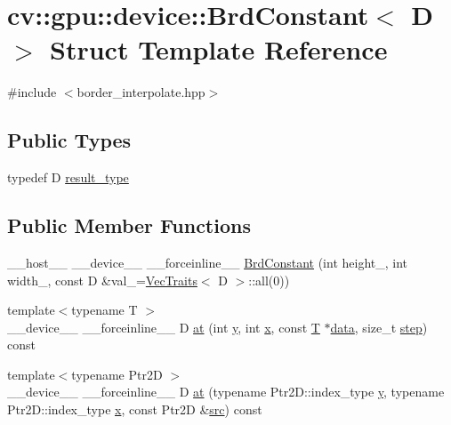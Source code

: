 \hypertarget{structcv_1_1gpu_1_1device_1_1BrdConstant}{\section{cv\-:\-:gpu\-:\-:device\-:\-:Brd\-Constant$<$ D $>$ Struct Template Reference}
\label{structcv_1_1gpu_1_1device_1_1BrdConstant}
}


{\ttfamily \#include $<$border\-\_\-interpolate.\-hpp$>$}

\subsection*{Public Types}
\begin{DoxyCompactItemize}
\item 
typedef D \hyperlink{structcv_1_1gpu_1_1device_1_1BrdConstant_af0bf8c2c898797b7d9be555293100236}{result\-\_\-type}
\end{DoxyCompactItemize}
\subsection*{Public Member Functions}
\begin{DoxyCompactItemize}
\item 
\-\_\-\-\_\-host\-\_\-\-\_\- \-\_\-\-\_\-device\-\_\-\-\_\- \-\_\-\-\_\-forceinline\-\_\-\-\_\- \hyperlink{structcv_1_1gpu_1_1device_1_1BrdConstant_a55f14a67102a8b817a74983cfcf8b096}{Brd\-Constant} (int height\-\_\-, int width\-\_\-, const D \&val\-\_\-=\hyperlink{structcv_1_1gpu_1_1device_1_1VecTraits}{Vec\-Traits}$<$ D $>$\-::all(0))
\item 
{\footnotesize template$<$typename T $>$ }\\\-\_\-\-\_\-device\-\_\-\-\_\- \-\_\-\-\_\-forceinline\-\_\-\-\_\- D \hyperlink{structcv_1_1gpu_1_1device_1_1BrdConstant_a75cbdce5d88dcc292f87375fdaa9c115}{at} (int \hyperlink{highgui__c_8h_af1202c02b14870c18fb3a1da73e9e7c7}{y}, int \hyperlink{highgui__c_8h_a6150e0515f7202e2fb518f7206ed97dc}{x}, const \hyperlink{calib3d_8hpp_a3efb9551a871ddd0463079a808916717}{T} $\ast$\hyperlink{legacy_8hpp_ab9fe6c09e6d02865a953fffc12fe6ca0}{data}, size\-\_\-t \hyperlink{legacy_8hpp_abc16e65f240ed0c8f3e876e8732c0a33}{step}) const 
\item 
{\footnotesize template$<$typename Ptr2\-D $>$ }\\\-\_\-\-\_\-device\-\_\-\-\_\- \-\_\-\-\_\-forceinline\-\_\-\-\_\- D \hyperlink{structcv_1_1gpu_1_1device_1_1BrdConstant_a46a93578277e588c4ca6345ac2207942}{at} (typename Ptr2\-D\-::index\-\_\-type \hyperlink{highgui__c_8h_af1202c02b14870c18fb3a1da73e9e7c7}{y}, typename Ptr2\-D\-::index\-\_\-type \hyperlink{highgui__c_8h_a6150e0515f7202e2fb518f7206ed97dc}{x}, const Ptr2\-D \&\hyperlink{legacy_8hpp_a371cd109b74033bc4366f584edd3dacc}{src}) const 
\end{DoxyCompactItemize}
